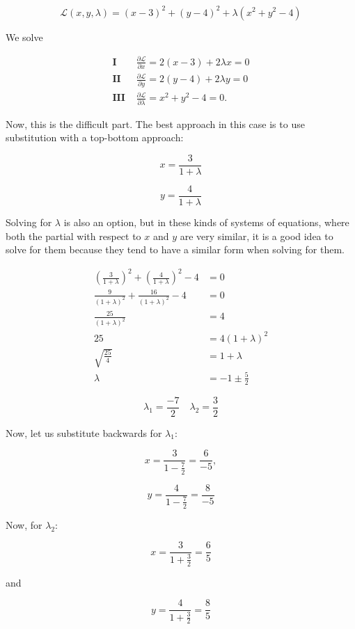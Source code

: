 \[
    \mathcal{L}(x, y, \lambda) = (x - 3)^2 + (y - 4)^2 + \lambda (x^2 + y^2 - 4)
\]

We solve

\begin{align*}
   \textbf{I } &\frac{\partial \mathcal{L}}{\partial x} = 2(x - 3) + 2\lambda x = 0 \\
   \textbf{II } &\frac{\partial \mathcal{L}}{\partial y} = 2(y - 4) + 2\lambda y = 0 \\
   \textbf{III } &\frac{\partial \mathcal{L}}{\partial \lambda} = x^2 + y^2 - 4 = 0.
\end{align*}

Now, this is the difficult part. The best approach in this case is to use substitution 
with a top-bottom approach:

\[
    x = \frac{3}{1 + \lambda}
\]

\[
    y = \frac{4}{1 + \lambda}
\]

Solving for \(\lambda\) is also an option, but in these kinds of systems of equations, where 
both the partial with respect to \(x\) and \(y\) are very similar, it is a good idea to solve for them 
because they tend to have a similar form when solving for them.

\begin{align*}
    \left(\frac{3}{1 + \lambda}\right)^2 + \left(\frac{4}{1 + \lambda}\right)^2 - 4 &= 0\\
    \frac{9}{(1 + \lambda)^2} + \frac{16}{(1 + \lambda)^2} - 4 &= 0\\
    \frac{25}{(1 + \lambda)^2} &= 4 \\
    25 &= 4 (1 + \lambda)^2 \\
    \sqrt{\frac{25}{4}} &= 1 + \lambda \\
    \lambda &= -1 \pm \frac{5}{2}
\end{align*}

\[
    \lambda_1 = \frac{-7}{2} \quad \lambda_2 = \frac{3}{2}
\]

Now, let us substitute backwards for \(\lambda_1\):

\[
    x = \frac{3}{1 - \frac{7}{2}} = \frac{6}{-5},
\]

\[
    y = \frac{4}{1 - \frac{7}{2}} = \frac{8}{-5}
\]

Now, for \(\lambda_2\):

\[
    x = \frac{3}{1 + \frac{3}{2}} = \frac{6}{5}
\]

and 

\[
    y = \frac{4}{1 + \frac{3}{2}} = \frac{8}{5}
\]

